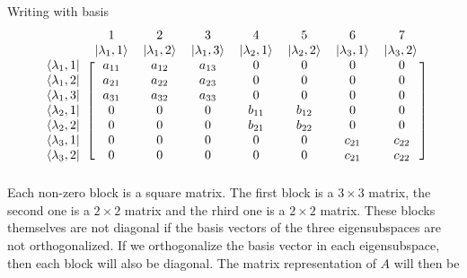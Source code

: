 %	
%
	
	Writing with basis
	\begin{equation}
	\begin{blockarray}{cccccccc}
	\ & 1 & 2 & 3 & 4 & 5 & 6 & 7 \\
	\ & \ket{\lambda_1, 1} & \ket{\lambda_1, 2} & \ket{\lambda_1, 3} & \ket{\lambda_2, 1} & \ket{\lambda_2, 2} & \ket{\lambda_3, 1} & \ket{\lambda_3, 2} \\
		\begin{block}{c[ccccccc]}
		\bra{\lambda_1, 1} & a_{11} & a_{12} & a_{13} & 0 & 0 & 0 & 0 \\
		\bra{\lambda_1, 2} & a_{21} & a_{22} & a_{23} & 0 & 0 & 0 & 0 \\
		\bra{\lambda_1, 3} & a_{31} & a_{32} & a_{33} & 0 & 0 & 0 & 0 \\ 
		\bra{\lambda_2, 1} & 0 & 0 & 0 & b_{11} & b_{12} & 0 & 0 \\
		\bra{\lambda_2, 2} & 0 & 0 & 0 & b_{21} & b_{22} & 0 & 0 \\ 
		\bra{\lambda_3, 1} & 0 & 0 & 0 & 0 & 0 & c_{21} & c_{22}\\
		\bra{\lambda_3, 2} & 0 & 0 & 0 & 0 & 0 & c_{21} & c_{22}  \\ 
		\end{block}
	\end{blockarray}
	\end{equation}
	Each non-zero block is a square matrix. The first block is a $3\times 3$ matrix, the second one is a $2\times 2$ matrix and the rhird one is a $2\times 2$ matrix. These blocks themselves are not diagonal if the basis vectors of the three eigensubspaces are not orthogonalized. If we orthogonalize the basis vector in each eigensubspace, then each block will also be diagonal. The matrix representation of $A$ will then be
	
